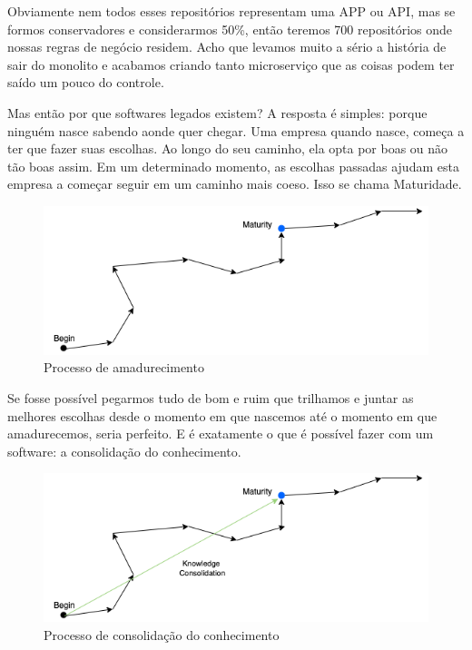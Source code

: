 Obviamente nem todos esses repositórios representam uma APP ou API, mas se formos conservadores e considerarmos 50\%, então teremos 700 repositórios onde nossas regras de negócio residem. Acho que levamos muito a sério a história de sair do monolito e acabamos criando tanto microserviço que as coisas podem ter saído um pouco do controle.

Mas então por que softwares legados existem? A resposta é simples: porque ninguém nasce sabendo aonde quer chegar. Uma empresa quando nasce, começa a ter que fazer suas escolhas. Ao longo do seu caminho, ela opta por boas ou não tão boas assim. Em um determinado momento, as escolhas passadas ajudam esta empresa a começar seguir em um caminho mais coeso. Isso se chama Maturidade.

\begin{figure}[H]
    \centering
    \includegraphics[scale=0.60,keepaspectratio=true]{images/02.png}
    \caption{Processo de amadurecimento}
    \label{mature_process}
\end{figure}

Se fosse possível pegarmos tudo de bom e ruim que trilhamos e juntar as melhores escolhas desde o momento em que nascemos até o momento em que amadurecemos, seria perfeito. E é exatamente o que é possível fazer com um software: a consolidação do conhecimento. 

\begin{figure}[H]
    \centering
    \includegraphics[scale=0.60,keepaspectratio=true]{images/03.png}
    \caption{Processo de consolidação do conhecimento}
    \label{knwledge_consolidation}
\end{figure}

